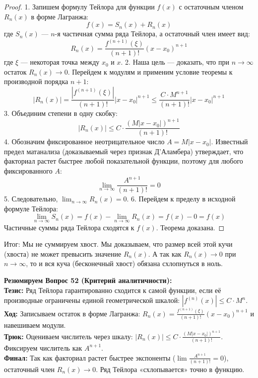 \begin{proof}
1. Запишем формулу Тейлора для функции $f(x)$ с остаточным членом $R_n(x)$ в форме Лагранжа:
$$ f(x) = S_n(x) + R_n(x) $$
где $S_n(x)$ — $n$-я частичная сумма ряда Тейлора, а остаточный член имеет вид:
$$ R_n(x) = \frac{f^{(n+1)}(\xi)}{(n+1)!} (x-x_0)^{n+1} $$
где $\xi$ — некоторая точка между $x_0$ и $x$.
2. Наша цель — доказать, что при $n \to \infty$ остаток $R_n(x) \to 0$. Перейдем к модулям и применим условие теоремы к производной порядка $n+1$:
$$ |R_n(x)| = \frac{|f^{(n+1)}(\xi)|}{(n+1)!} |x-x_0|^{n+1} \le \frac{C \cdot M^{n+1}}{(n+1)!} |x-x_0|^{n+1} $$
3. Объединим степени в одну скобку:
$$ |R_n(x)| \le C \cdot \frac{(M |x-x_0|)^{n+1}}{(n+1)!} $$
4. Обозначим фиксированное неотрицательное число $A = M |x-x_0|$. Известный предел матанализа (доказываемый через признак Д'Аламбера) утверждает, что факториал растет быстрее любой показательной функции, поэтому для любого фиксированного $A$:
$$ \lim_{n \to \infty} \frac{A^{n+1}}{(n+1)!} = 0 $$
5. Следовательно, $\lim_{n \to \infty} R_n(x) = 0$.
6. Перейдем к пределу в исходной формуле Тейлора:
$$ \lim_{n \to \infty} S_n(x) = f(x) - \lim_{n \to \infty} R_n(x) = f(x) - 0 = f(x) $$
Частичные суммы ряда Тейлора сходятся к $f(x)$. Теорема доказана.
\end{proof}
Итог: Мы не суммируем хвост. Мы доказываем, что размер всей этой кучи (хвоста) не может превысить значение $R_n(x)$. А так как $R_n(x) \to 0$ при $n \to \infty$, то и вся куча (бесконечный хвост) обязана схлопнуться в ноль.
\begin{tcolorbox}[colback=gray!5, colframe=black, boxrule=0.5pt, arc=0pt]
\textbf{Резюмируем Вопрос 52 (Критерий аналитичности):} \\
\textbf{Тезис:} Ряд Тейлора гарантированно сходится к самой функции, если её производные ограничены единой геометрической шкалой: $|f^{(n)}(x)| \le C \cdot M^n$. \\
\textbf{Ход:} Записываем остаток в форме Лагранжа: $R_n(x) = \frac{f^{(n+1)}(\xi)}{(n+1)!} (x-x_0)^{n+1}$ и навешиваем модули. \\
\textbf{Трюк:} Оцениваем числитель через шкалу: $|R_n(x)| \le C \cdot \frac{(M|x-x_0|)^{n+1}}{(n+1)!}$. Фиксируем числитель как $A^{n+1}$. \\
\textbf{Финал:} Так как факториал растет быстрее экспоненты ($\lim \frac{A^{n+1}}{(n+1)!} = 0$), остаточный член $R_n(x) \to 0$. Ряд Тейлора «схлопывается» точно в функцию.
\end{tcolorbox}



